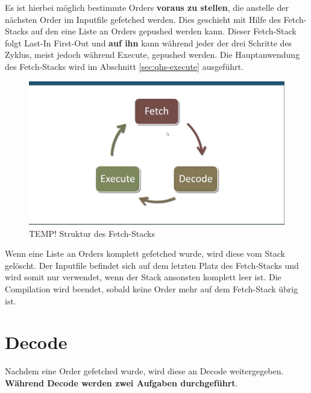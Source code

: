 Es ist hierbei möglich bestimmte Orders \textbf{voraus zu stellen}, die anstelle der nächsten Order im Inputfile gefetched werden. Dies geschieht mit Hilfe des Fetch-Stacks auf den eine Liste an Orders gepushed werden kann.
Dieser Fetch-Stack folgt Last-In First-Out und \textbf{auf ihn} kann während jeder der drei Schritte des Zyklus, meist jedoch während Execute, gepushed werden.
Die Hauptanwendung des Fetch-Stacks wird im Abschnitt \ref{sec:qhs-execute} ausgeführt.

\begin{figure}[h!]
    \centering
    \includegraphics[scale=0.3]{resources/TEMP_von-neumann-cycle.jpg}
    \caption{TEMP! Struktur des Fetch-Stacks}
    \label{fig:fetch-stack}
\end{figure}

Wenn eine Liste an Orders komplett gefetched wurde, wird diese vom Stack gelöscht. Der Inputfile befindet sich auf dem letzten Platz des Fetch-Stacks und wird somit nur verwendet, wenn der Stack ansonsten komplett leer ist.
Die Compilation wird beendet, sobald keine Order mehr auf dem Fetch-Stack übrig ist.

\section{Decode} \label{sec:qhs-decode}
Nachdem eine Order gefetched wurde, wird diese an Decode weitergegeben. \textbf{Während Decode werden zwei Aufgaben durchgeführt}.

